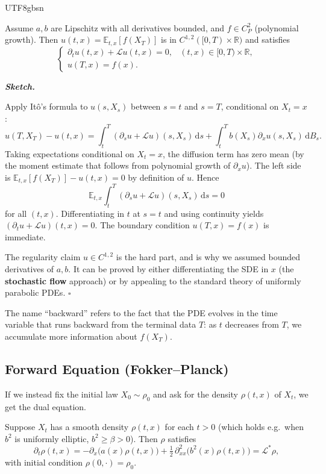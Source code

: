 \documentclass{article}
\newenvironment{proof}[1][Proof]{%
  \par\smallskip\noindent\textit{\textbf{#1.}}\quad\ignorespaces
}{%
  \hfill$\square$\par\smallskip
}
\begin{document}
\begin{CJK*}{UTF8}{gbsn}
\begin{theorem}\label{thm:backward}
Assume $a,b$ are Lipschitz with all derivatives bounded, and $f\in C^2_P$ (polynomial growth). Then $u(t,x)=\mathbb{E}_{t,x}[f(X_T)]$ is in $C^{1,2}([0,T)\times\mathbb{R})$ and satisfies
\[
  \begin{cases}
    \partial_t u(t,x)+\mathcal{L}u(t,x)=0,& (t,x)\in[0,T)\times\mathbb{R},\\
    u(T,x)=f(x).
  \end{cases}
\]
\end{theorem}

\begin{proof}[Sketch]
Apply It\^o's formula to $u(s,X_s)$ between $s=t$ and $s=T$, conditional on $X_t=x$:
\[
  u(T,X_T)-u(t,x)=\int_t^T(\partial_s u+\mathcal{L}u)(s,X_s)\,\mathrm{d}s+\int_t^T b(X_s)\partial_x u(s,X_s)\,\mathrm{d}B_s.
\]
Taking expectations conditional on $X_t=x$, the diffusion term has zero mean (by the moment estimate that follows from polynomial growth of $\partial_x u$). The left side is $\mathbb{E}_{t,x}[f(X_T)]-u(t,x)=0$ by definition of $u$. Hence
\[
  \mathbb{E}_{t,x}\!\int_t^T(\partial_s u+\mathcal{L}u)(s,X_s)\,\mathrm{d}s=0
\]
for all $(t,x)$. Differentiating in $t$ at $s=t$ and using continuity yields $(\partial_t u+\mathcal{L}u)(t,x)=0$. The boundary condition $u(T,x)=f(x)$ is immediate.

The regularity claim $u\in C^{1,2}$ is the hard part, and is why we assumed bounded derivatives of $a,b$. It can be proved by either differentiating the SDE in $x$ (the \textbf{stochastic flow} approach) or by appealing to the standard theory of uniformly parabolic PDEs.
\end{proof}

The name ``backward'' refers to the fact that the PDE evolves in the time variable that runs backward from the terminal data $T$: as $t$ decreases from $T$, we accumulate more information about $f(X_T)$.

\subsection{Forward Equation (Fokker--Planck)}

If we instead fix the initial law $X_0\sim\rho_0$ and ask for the density $\rho(t,x)$ of $X_t$, we get the dual equation.

\begin{theorem}\label{thm:fpe}
Suppose $X_t$ has a smooth density $\rho(t,x)$ for each $t>0$ (which holds e.g.\ when $b^2$ is uniformly elliptic, $b^2\ge\beta>0$). Then $\rho$ satisfies
\[
  \partial_t\rho(t,x)=-\partial_x\bigl(a(x)\rho(t,x)\bigr)+\tfrac{1}{2}\,\partial_{xx}^2\bigl(b^2(x)\rho(t,x)\bigr)=\mathcal{L}^*\rho,
\]
with initial condition $\rho(0,\cdot)=\rho_0$.
\end{theorem}


\end{CJK*}
\end{document}
